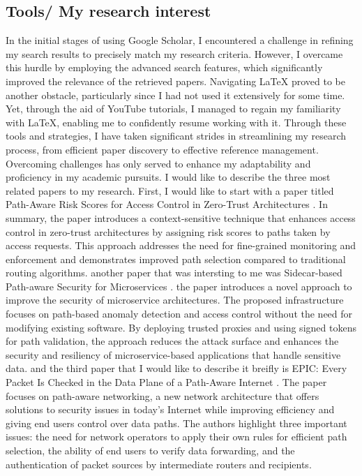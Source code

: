 \begin{text}
\section{Tools/ My research interest}
\begin{text}
In the initial stages of using Google Scholar, I encountered a challenge in refining my search results to precisely match my research criteria. However, I overcame this hurdle by employing the advanced search features, which significantly improved the relevance of the retrieved papers.
Navigating LaTeX proved to be another obstacle, particularly since I had not used it extensively for some time. Yet, through the aid of YouTube tutorials, I managed to regain my familiarity with LaTeX, enabling me to confidently resume working with it.
Through these tools and strategies, I have taken significant strides in streamlining my research process, from efficient paper discovery to effective reference management. Overcoming challenges has only served to enhance my adaptability and proficiency in my academic pursuits.
I would like to describe the three most related papers to my research. First, I would like to start with a paper titled Path-Aware Risk Scores for Access Control in
Zero-Trust Architectures 
\cite{seaton2022poster}. In summary, the paper introduces a context-sensitive technique that enhances access control in zero-trust architectures by assigning risk scores to paths taken by access requests. This approach addresses the need for fine-grained monitoring and enforcement and demonstrates improved path selection compared to traditional routing algorithms.
another paper that was intersting to me was Sidecar-based Path-aware Security for Microservices \cite{meadows2023sidecar}. the paper introduces a novel approach to improve the security of microservice architectures. The proposed infrastructure focuses on path-based anomaly detection and access control without the need for modifying existing software. By deploying trusted proxies and using signed tokens for path validation, the approach reduces the attack surface and enhances the security and resiliency of microservice-based applications that handle sensitive data.
and the third paper that I would like to describe it breifly is EPIC: Every Packet Is Checked in the Data Plane of a Path-Aware Internet \cite{legner2020epic}. The paper focuses on path-aware networking, a new network architecture that offers solutions to security issues in today's Internet while improving efficiency and giving end users control over data paths. The authors highlight three important issues: the need for network operators to apply their own rules for efficient path selection, the ability of end users to verify data forwarding, and the authentication of packet sources by intermediate routers and recipients. 
\end{text}


\end{text}
